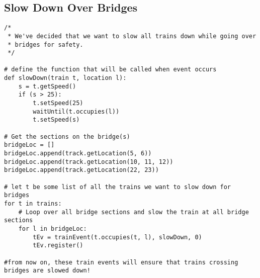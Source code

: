 \documentclass[a4paper,11pt,notitlepage]{article}
\begin{document}
\subsection{Slow Down Over Bridges}
\begin{verbatim}
/*
 * We've decided that we want to slow all trains down while going over
 * bridges for safety.
 */

# define the function that will be called when event occurs
def slowDown(train t, location l):
    s = t.getSpeed()
    if (s > 25):
        t.setSpeed(25)
        waitUntil(t.occupies(l))
        t.setSpeed(s)

# Get the sections on the bridge(s)
bridgeLoc = []
bridgeLoc.append(track.getLocation(5, 6))
bridgeLoc.append(track.getLocation(10, 11, 12))
bridgeLoc.append(track.getLocation(22, 23))

# let t be some list of all the trains we want to slow down for bridges
for t in trains:
    # Loop over all bridge sections and slow the train at all bridge sections
    for l in bridgeLoc:
        tEv = trainEvent(t.occupies(t, l), slowDown, 0)
        tEv.register()

#from now on, these train events will ensure that trains crossing bridges are slowed down!

\end{verbatim}
\end{document}
